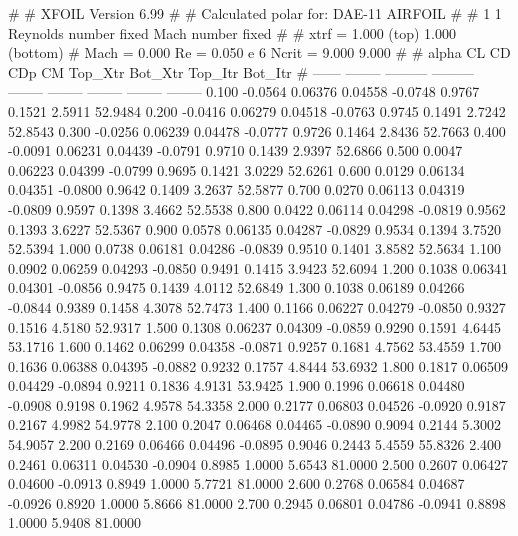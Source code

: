 #  
#       XFOIL         Version 6.99
#  
# Calculated polar for: DAE-11 AIRFOIL                                  
#  
# 1 1 Reynolds number fixed          Mach number fixed         
#  
# xtrf =   1.000 (top)        1.000 (bottom)  
# Mach =   0.000     Re =     0.050 e 6     Ncrit =   9.000  9.000
#  
#   alpha    CL        CD       CDp       CM     Top_Xtr  Bot_Xtr  Top_Itr  Bot_Itr
#  ------ -------- --------- --------- -------- -------- -------- -------- --------
   0.100  -0.0564   0.06376   0.04558  -0.0748   0.9767   0.1521   2.5911  52.9484
   0.200  -0.0416   0.06279   0.04518  -0.0763   0.9745   0.1491   2.7242  52.8543
   0.300  -0.0256   0.06239   0.04478  -0.0777   0.9726   0.1464   2.8436  52.7663
   0.400  -0.0091   0.06231   0.04439  -0.0791   0.9710   0.1439   2.9397  52.6866
   0.500   0.0047   0.06223   0.04399  -0.0799   0.9695   0.1421   3.0229  52.6261
   0.600   0.0129   0.06134   0.04351  -0.0800   0.9642   0.1409   3.2637  52.5877
   0.700   0.0270   0.06113   0.04319  -0.0809   0.9597   0.1398   3.4662  52.5538
   0.800   0.0422   0.06114   0.04298  -0.0819   0.9562   0.1393   3.6227  52.5367
   0.900   0.0578   0.06135   0.04287  -0.0829   0.9534   0.1394   3.7520  52.5394
   1.000   0.0738   0.06181   0.04286  -0.0839   0.9510   0.1401   3.8582  52.5634
   1.100   0.0902   0.06259   0.04293  -0.0850   0.9491   0.1415   3.9423  52.6094
   1.200   0.1038   0.06341   0.04301  -0.0856   0.9475   0.1439   4.0112  52.6849
   1.300   0.1038   0.06189   0.04266  -0.0844   0.9389   0.1458   4.3078  52.7473
   1.400   0.1166   0.06227   0.04279  -0.0850   0.9327   0.1516   4.5180  52.9317
   1.500   0.1308   0.06237   0.04309  -0.0859   0.9290   0.1591   4.6445  53.1716
   1.600   0.1462   0.06299   0.04358  -0.0871   0.9257   0.1681   4.7562  53.4559
   1.700   0.1636   0.06388   0.04395  -0.0882   0.9232   0.1757   4.8444  53.6932
   1.800   0.1817   0.06509   0.04429  -0.0894   0.9211   0.1836   4.9131  53.9425
   1.900   0.1996   0.06618   0.04480  -0.0908   0.9198   0.1962   4.9578  54.3358
   2.000   0.2177   0.06803   0.04526  -0.0920   0.9187   0.2167   4.9982  54.9778
   2.100   0.2047   0.06468   0.04465  -0.0890   0.9094   0.2144   5.3002  54.9057
   2.200   0.2169   0.06466   0.04496  -0.0895   0.9046   0.2443   5.4559  55.8326
   2.400   0.2461   0.06311   0.04530  -0.0904   0.8985   1.0000   5.6543  81.0000
   2.500   0.2607   0.06427   0.04600  -0.0913   0.8949   1.0000   5.7721  81.0000
   2.600   0.2768   0.06584   0.04687  -0.0926   0.8920   1.0000   5.8666  81.0000
   2.700   0.2945   0.06801   0.04786  -0.0941   0.8898   1.0000   5.9408  81.0000
